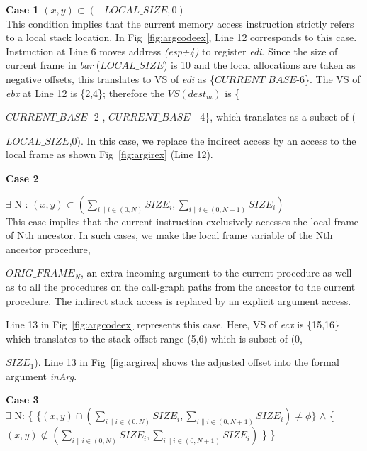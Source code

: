 \textbf{Case 1} {\scriptsize $(x,y) \subset (-LOCAL\_SIZE,0)$\\}
This condition implies that the current memory access instruction strictly refers to a local stack location. In Fig~\ref{fig:argcodeex}, Line 12 corresponds to this case. Instruction at Line 6 moves address \emph{(esp+4)} to register \emph{edi}. Since the size of current frame in \emph{bar} ({\scriptsize $LOCAL\_SIZE$}) is 10 and the local allocations are taken as negative offsets, this translates to VS of \emph{edi} as \{{\scriptsize $CURRENT\_BASE$-6}\}. The VS of \emph{ebx} at Line 12 is \{2,4\}; therefore the \emph{$VS(dest_m)$} is \{{{\scriptsize $CURRENT\_BASE$ -2 , $CURRENT\_BASE$ - 4}\}, which translates as a subset of (-{{\scriptsize $LOCAL\_SIZE$},0). In this case, we replace the indirect access by an access to the local frame as shown Fig~\ref{fig:argirex} (Line 12).

  \textbf{Case 2} {{\scriptsize $\exists$ N : $(x,y) \subset (\sum_{i \| i \in (0,N)} SIZE_{i}, \sum_{i \| i \in (0,N+1)}	SIZE_{i})$}\\
This case implies that the current instruction exclusively accesses the local frame of Nth ancestor. In such cases, we make the local frame variable of the Nth ancestor procedure, {{\scriptsize $ORIG\_FRAME_{N}$}, an extra incoming argument to the current procedure as well as to all the procedures on the call-graph paths from the ancestor to the current procedure. The indirect stack access is replaced by an explicit argument access. 

Line 13 in Fig~\ref{fig:argcodeex} represents this case. Here, VS of \emph{ecx} is \{15,16\} which translates to the stack-offset range (5,6) which is subset of (0,{{\scriptsize $SIZE_{1}$}). Line 13 in Fig~\ref{fig:argirex} shows the adjusted offset into the formal argument \emph{inArg}. 


 \textbf{Case 3} \\{\scriptsize 
 $\exists$ N: \{ \{$(x,y) \cap (\sum_{i \| i \in (0,N)} SIZE_{i}, \sum_{i \| i \in (0,N+1)} SIZE_{i}) \neq \phi \} $
 $\wedge$ \{$(x,y) \not \subset (\sum_{i \| i \in (0,N)} SIZE_{i}, \sum_{i \| i \in (0,N+1)} SIZE_{i}) $ \} \}}
			 
}}}}}
